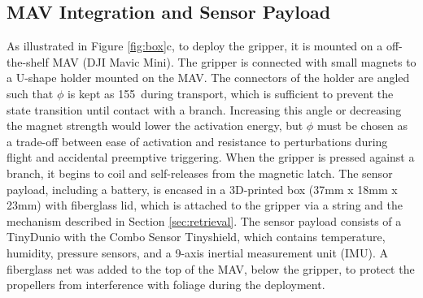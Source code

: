 \subsection{MAV Integration and Sensor Payload}
\label{sec:sensor_drone_integration}
As illustrated in Figure \ref{fig:box}c, to deploy the gripper, it is mounted on a off-the-shelf MAV (DJI Mavic Mini). The gripper is connected with small magnets to a U-shape holder mounted on the MAV. The connectors of the holder are angled such that $\phi$ is kept as 155\degree\ during transport, which is sufficient to prevent the state transition until contact with a branch.
Increasing this angle or decreasing the magnet strength would lower the activation energy, but $\phi$ must be chosen as a trade-off between ease of activation and resistance to perturbations during flight and accidental preemptive triggering. When the gripper is pressed against a branch, it begins to coil and self-releases from the magnetic latch. The sensor payload, including a battery, is encased in a 3D-printed box (37mm x 18mm x 23mm) with fiberglass lid, which is attached to the gripper via a string and the mechanism described in Section \ref{sec:retrieval}. The sensor payload consists of a TinyDunio with the Combo Sensor Tinyshield, which contains temperature, humidity, pressure sensors, and a 9-axis inertial measurement unit (IMU).
A fiberglass net was added to the top of the MAV, below the gripper, to protect the propellers from interference with foliage during the deployment.

